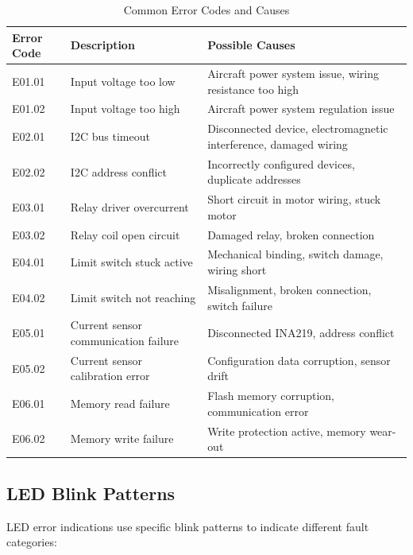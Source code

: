 \documentclass[12pt,a4paper,twoside,openright]{book}
\newcommand{\tabletextfont}{\normalfont\rmfamily}
\newcommand{\tableheadfont}{\normalfont\bfseries}
\begin{document}
\begin{table}[h]
\centering
\setlength{\tabcolsep}{5pt} %
\begin{tabular}{|p{}|p{}|p{}|}
\hline
\tableheadfont\textbf{Error Code} & \tableheadfont\textbf{Description} & \tableheadfont\textbf{Possible Causes} \\
\hline
\tabletextfont E01.01 & Input voltage too low & Aircraft power system issue, wiring resistance too high \\
\hline
\tabletextfont E01.02 & Input voltage too high & Aircraft power system regulation issue \\
\hline
\tabletextfont E02.01 & I2C bus timeout & Disconnected device, electromagnetic interference, damaged wiring \\
\hline
\tabletextfont E02.02 & I2C address conflict & Incorrectly configured devices, duplicate addresses \\
\hline
\tabletextfont E03.01 & Relay driver overcurrent & Short circuit in motor wiring, stuck motor \\
\hline
\tabletextfont E03.02 & Relay coil open circuit & Damaged relay, broken connection \\
\hline
\tabletextfont E04.01 & Limit switch stuck active & Mechanical binding, switch damage, wiring short \\
\hline
\tabletextfont E04.02 & Limit switch not reaching & Misalignment, broken connection, switch failure \\
\hline
\tabletextfont E05.01 & Current sensor communication failure & Disconnected INA219, address conflict \\
\hline
\tabletextfont E05.02 & Current sensor calibration error & Configuration data corruption, sensor drift \\
\hline
\tabletextfont E06.01 & Memory read failure & Flash memory corruption, communication error \\
\hline
\tabletextfont E06.02 & Memory write failure & Write protection active, memory wear-out \\
\hline
\end{tabular}
\caption{Common Error Codes and Causes}
\end{table}

\subsection{LED Blink Patterns}

LED error indications use specific blink patterns to indicate different fault categories:
\end{document}
